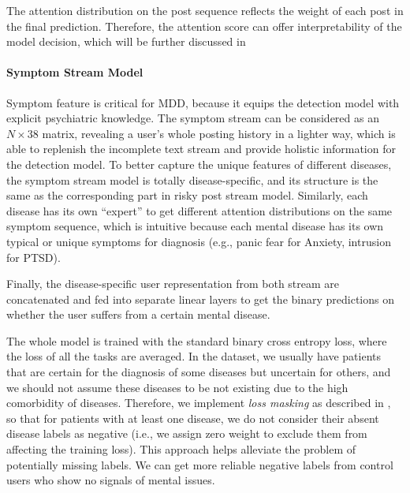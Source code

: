 The attention distribution on the post sequence reflects the weight of each post in the final prediction. Therefore, the attention score can offer interpretability of the model decision, which will be further discussed in 


\paragraph{Symptom Stream Model} 
Symptom feature is critical for MDD, because it equips the detection model with explicit psychiatric knowledge. The symptom stream can be considered as an $N \times 38$ matrix, revealing a user's whole posting history in a lighter way, 
which is able to replenish the incomplete text stream and provide holistic 
information for the detection model.
To better capture the unique features of different diseases, the symptom stream model is totally disease-specific, and its structure is the same as the corresponding part in risky post stream model. Similarly, each disease has its own ``expert'' to get different attention distributions on the same symptom sequence, which is intuitive because each mental disease has its own typical or unique symptoms for diagnosis (e.g., panic fear for Anxiety, intrusion for PTSD). 

Finally, the disease-specific user representation from both stream are concatenated and fed into separate linear layers to get the binary predictions on whether the user suffers from a certain mental disease. 

The whole model is trained with the standard binary cross entropy loss, where the loss of all the tasks are averaged. In the dataset, we usually have patients that are certain for the diagnosis of some diseases but uncertain for others, and we should not assume these diseases to be not existing due to the high comorbidity of diseases. Therefore, we implement \textit{loss masking} as described in \citet{fonseca2020addressing}, 
so that for patients with at least one disease, we do not consider their absent disease labels as negative (i.e., we assign zero weight to exclude them from affecting the training loss). This approach helps alleviate the problem of potentially missing labels. We can get more reliable negative labels from control users who show no signals of mental issues.

